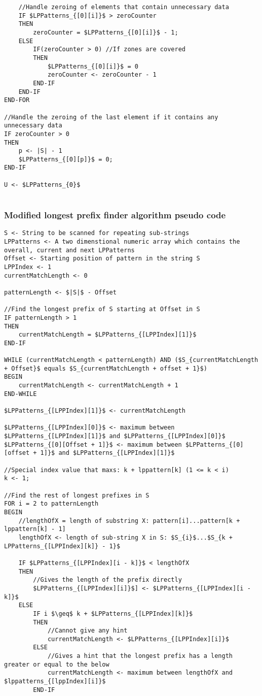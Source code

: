 \documentclass[12pt]{article}
\begin{document}
\begin{flushleft}
\begin{lstlisting}
	//Handle zeroing of elements that contain unnecessary data
	IF $LPPatterns_{[0][i]}$ > zeroCounter 
	THEN
		zeroCounter = $LPPatterns_{[0][i]}$ - 1;
	ELSE 
		IF(zeroCounter > 0) //If zones are covered
		THEN
			$LPPatterns_{[0][i]}$ = 0
			zeroCounter <- zeroCounter - 1
		END-IF                   
	END-IF
END-FOR

//Handle the zeroing of the last element if it contains any unnecessary data
IF zeroCounter > 0
THEN
	p <- |S| - 1
	$LPPatterns_{[0][p]}$ = 0;
END-IF

U <- $LPPatterns_{0}$


\end{lstlisting}

\newpage
\subsubsection{Modified longest prefix finder algorithm pseudo code}

\begin{lstlisting}
S <- String to be scanned for repeating sub-strings
LPPatterns <- A two dimenstional numeric array which contains the overall, current and next LPPatterns 
Offset <- Starting position of pattern in the string S
LPPIndex <- 1 
currentMatchLength <- 0

patternLength <- $|S|$ - Offset

//Find the longest prefix of S starting at Offset in S
IF patternLength > 1 
THEN
	currentMatchLength = $LPPatterns_{[LPPIndex][1]}$
END-IF

WHILE (currentMatchLength < patternLength) AND ($S_{currentMatchLength + Offset}$ equals $S_{currentMatchLength + offset + 1}$)
BEGIN
	currentMatchLength <- currentMatchLength + 1
END-WHILE

$LPPatterns_{[LPPIndex][1]}$ <- currentMatchLength

$LPPatterns_{[LPPIndex][0]}$ <- maximum between $LPPatterns_{[LPPIndex][1]}$ and $LPPatterns_{[LPPIndex][0]}$
$LPPatterns_{[0][Offset + 1]}$ <- maximum between $LPPatterns_{[0][offset + 1]}$ and $LPPatterns_{[LPPIndex][1]}$

//Special index value that maxs: k + lppattern[k] (1 <= k < i)
k <- 1;

//Find the rest of longest prefixes in S
FOR i = 2 to patternLength
BEGIN
	//lengthOfX = length of substring X: pattern[i]...pattern[k + lppattern[k] - 1]
	lengthOfX <- length of sub-string X in S: $S_{i}$...$S_{k + LPPatterns_{[LPPIndex][k]} - 1}$
	
	IF $LPPatterns_{[LPPIndex][i - k]}$ < lengthOfX
	THEN
		//Gives the length of the prefix directly
		$LPPatterns_{[LPPIndex][i]}$] <- $LPPatterns_{[LPPIndex][i - k]}$
	ELSE	
		IF i $\geq$ k + $LPPatterns_{[LPPIndex][k]}$
		THEN
			//Cannot give any hint
			currentMatchLength <- $LPPatterns_{[LPPIndex][i]}$
		ELSE
			//Gives a hint that the longest prefix has a length greater or equal to the below
			currentMatchLength <- maximum between lengthOfX and $lppatterns_{[lppIndex][i]}$
		END-IF
		

\end{lstlisting}
\end{flushleft}
\end{document}
